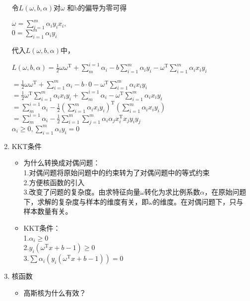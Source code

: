 \begin{enumerate}
	令$L(\omega,b,\alpha)$对$\omega$ 和b的偏导为零可得
	\begin{center}
		$\omega=\sum_{i=1}^{m}\alpha_{i}y_{i}x_{i},$\\
		$0=\sum_{i=1}^{m}\alpha_{i}y_{i}$
	\end{center}
	代入$L(\omega,b,\alpha)$中，\\
	\begin{center}
		$L(\omega,b,\alpha)=\frac{1}{2}\omega\omega^\mathrm{T}+\sum_{m}^{i=1}\alpha_i-b\sum_{i=1}^{m}\alpha_{i}y_i-\omega^\mathrm{T}\sum_{i=1}^{m}\alpha_{i}x_{i}y_{i}$
	\end{center} $=\frac{1}{2}\omega\omega^\mathrm{T}+\sum_{i=1}^{m}\alpha_i-b\cdot0-\omega^\mathrm{T}\sum_{i=1}^{m}\alpha_{i}x_{i}y_{i}$\\
		\qquad\qquad $=\frac{1}{2}\omega^\mathrm{T}\sum_{i=1}^{m}\alpha_{i}x_{i}y_{i}+\sum_{m}^{i=1}\alpha_i-\omega^\mathrm{T}\sum_{i=1}^{m}\alpha_{i}x_{i}y_{i}$\\
		\qquad\qquad\quad $=\sum_{m}^{i=1}\alpha_i-\frac{1}{2}(\sum_{i=1}^{m}\alpha_{i}x_{i}y_{i})^\mathrm{T}(\sum_{i=1}^{m}\alpha_{i}x_{i}y_{i})$\\
		\qquad\qquad\quad $=\sum_{m}^{i=1}\alpha_i-\frac{1}{2}\sum_{i=1}^{m}\sum_{j=1}^{m}\alpha_{i}\alpha_{j}x_{i}^\mathrm{T}x_{j}y_{i}y_{j}$\\
		\qquad\qquad\quad $\alpha_i \geq 0, \sum_{i=1}^{m}\alpha_{i}y_{i}=0$\\
	\item KKT条件
	\begin{itemize}
		\item 为什么转换成对偶问题：\\			
		1.对偶问题将原始问题中的约束转为了对偶问题中的等式约束\\
		2.方便核函数的引入\\
		3.改变了问题的复杂度。由求特征向量$\omega$转化为求比例系数$\alpha$，在原始问题下，求解的复杂度与样本的维度有关，即$\omega$的维度。在对偶问题下，只与样本数量有关。\\
		\item KKT条件：\\
		1.\quad $\alpha_{i} \geq 0$\\
		2.\quad $y_{i}(\omega^\mathrm{T}x+b-1) \geq 0$\\
		3.\quad $\sum\alpha_{i}(y_{i}(\omega^\mathrm{T}x+b-1))=0$\\
	\end{itemize}
	\item 核函数
	\begin{itemize}
		\item 高斯核为什么有效？\\

\end{itemize}
\end{enumerate}
